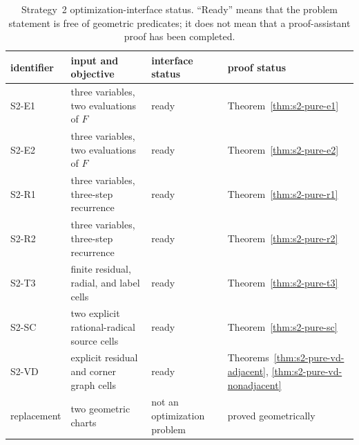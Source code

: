 \begin{table}[H]
\centering
\small
\renewcommand{\arraystretch}{1.12}
\begin{tabular}{@{}p{}p{}p{}p{}@{}}
\toprule
identifier&input and objective&interface status&proof status\\
\midrule
S2-E1&three variables, two evaluations of \(F\)&ready&Theorem~\ref{thm:s2-pure-e1}\\
S2-E2&three variables, two evaluations of \(F\)&ready&Theorem~\ref{thm:s2-pure-e2}\\
S2-R1&three variables, three-step recurrence&ready&Theorem~\ref{thm:s2-pure-r1}\\
S2-R2&three variables, three-step recurrence&ready&Theorem~\ref{thm:s2-pure-r2}\\
S2-T3&finite residual, radial, and label cells&ready&Theorem~\ref{thm:s2-pure-t3}\\
S2-SC&two explicit rational-radical source cells&ready&Theorem~\ref{thm:s2-pure-sc}\\
S2-VD&explicit residual and corner graph cells&ready&Theorems~\ref{thm:s2-pure-vd-adjacent}, \ref{thm:s2-pure-vd-nonadjacent}\\
replacement&two geometric charts&not an optimization problem&proved geometrically\\
\bottomrule
\end{tabular}
\caption{Strategy~2 optimization-interface status.  ``Ready'' means that the
problem statement is free of geometric predicates; it does not mean that a
proof-assistant proof has been completed.}
\label{tab:s2-formalization-status}
\end{table}
